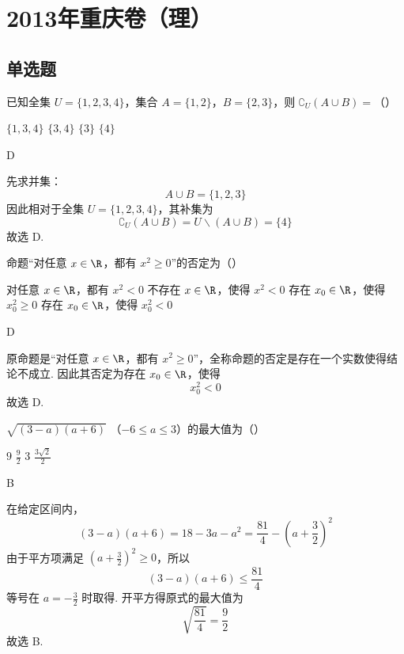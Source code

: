 \chapter{2013年重庆卷（理）}

\section{单选题}

\begin{problem}
已知全集 \(U = \{1, 2, 3, 4\}\)，集合 \(A = \{1, 2\}\)，\(B = \{2, 3\}\)，则 \(\complement_U (A \cup B) =\)（\quad）

\choices
    {\(\{1,3,4\}\)}
    {\(\{3,4\}\)}
    {\(\{3\}\)}
    {\(\{4\}\)}

\begin{answer}
D
\end{answer}

\begin{solution}
先求并集：
\[
A\cup B=\{1,2,3\}
\]
因此相对于全集 \(U=\{1,2,3,4\}\)，其补集为
\[
\complement_U(A\cup B)=U\smallsetminus(A\cup B)=\{4\}
\]
故选 D.
\end{solution}
\end{problem}

\begin{problem}
命题“对任意 \(x \in \R\)，都有 \(x^2 \geqslant 0\)”的否定为（\quad）

\choices
    {对任意 \(x \in \R\)，都有 \(x^2 < 0\)}
    {不存在 \(x \in \R\)，使得 \(x^2 < 0\)}
    {存在 \(x_0 \in \R\)，使得 \(x_0^2 \geqslant 0\)}
    {存在 \(x_0 \in \R\)，使得 \(x_0^2 < 0\)}

\begin{answer}
D
\end{answer}

\begin{solution}
原命题是“对任意 \(x\in\R\)，都有 \(x^2\geqslant0\)”，全称命题的否定是存在一个实数使得结论不成立. 因此其否定为存在 \(x_0\in\R\)，使得
\[
x_0^2<0
\]
故选 D.
\end{solution}
\end{problem}

\begin{problem}
\(\sqrt{(3 - a)(a + 6)} \) （\(-6\leqslant a\leqslant 3\)）的最大值为（\quad）

\choices
    {\(9\)}
    {\( \frac{9}{2} \)}
    {\(3\)}
    {\(\frac{3\sqrt{2}}{2}\)}

\begin{answer}
B
\end{answer}

\begin{solution}
在给定区间内，
\[
(3-a)(a+6)=18-3a-a^2=\frac{81}{4}-\left(a+\frac{3}{2}\right)^2
\]
由于平方项满足 \(\left(a+\frac{3}{2}\right)^2\geqslant0\)，所以
\[
(3-a)(a+6)\leqslant\frac{81}{4}
\]
等号在 \(a=-\frac{3}{2}\) 时取得. 开平方得原式的最大值为
\[
\sqrt{\frac{81}{4}}=\frac{9}{2}
\]
故选 B.
\end{solution}
\end{problem}

